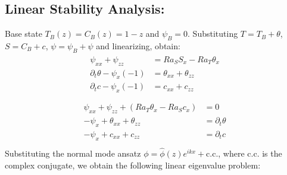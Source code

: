 \documentclass{article}
\begin{document}
\subsection{Linear Stability Analysis:}
Base state $T_{B} (z) = C_{B}(z) = 1 - z$ and $\psi_{B} = 0$. Substituting $T = T_{B} + \theta$,$S = C_{B} + c$, $\psi = \psi_{B} + \psi$ and linearizing, obtain:
\begin{align}
 \begin{split}
  \psi_{xx} + \psi_{zz} &= Ra_{S}S_{x} - Ra_{T}\theta_{x}\\
  \partial_{t}\theta - \psi_{x}(-1) &= \theta_{xx} + \theta_{zz}\\
  \partial_{t}c - \psi_{x}(-1) &= c_{xx} + c_{zz}\\
 \end{split}
\end{align}
%
\begin{align}
 \begin{split}
  \psi_{xx} + \psi_{zz} + (Ra_{T}\theta_{x} - Ra_{S}c_{x}) &= 0  \\
  - \psi_{x} + \theta_{xx} + \theta_{zz} &= \partial_{t}\theta\\
  - \psi_{x} + c_{xx} + c_{zz} &= \partial_{t}c \\
 \end{split}
\end{align}
Substituting the normal mode ansatz $\phi = \hat{\phi}(z) e^{ikx} + \textrm{c.c.}$, where c.c. is the complex conjugate, we obtain the following linear eigenvalue problem:
\end{document}
